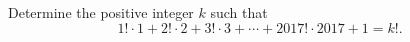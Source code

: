 Determine the positive integer $k$ such that
\[
1!\cdot1+2!\cdot2+3!\cdot3+\cdots+2017!\cdot2017+1=k! .
\]
